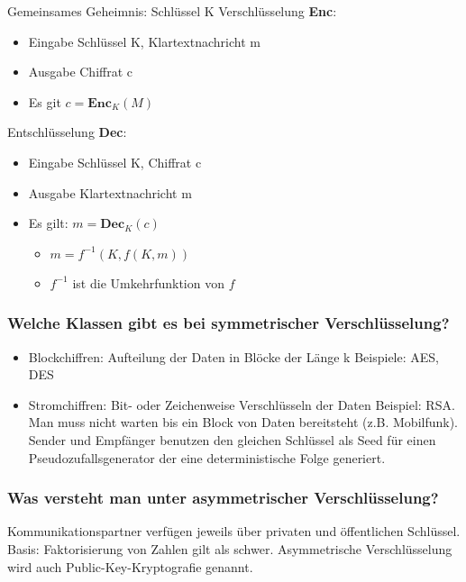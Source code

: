 	Gemeinsames Geheimnis: Schlüssel K
	Verschlüsselung \textbf{Enc}:
		\begin{itemize}
			\item Eingabe Schlüssel K, Klartextnachricht m
			\item Ausgabe Chiffrat c
			\item Es git $c=\textbf{Enc}_K(M)$
		\end{itemize}
	Entschlüsselung \textbf{Dec}:
		\begin{itemize}
			\item Eingabe Schlüssel K, Chiffrat c
			\item Ausgabe Klartextnachricht m
			\item Es gilt: $m = \textbf{Dec}_K(c)$
				\begin{itemize}
					\item $m = f^{-1}(K,f(K,m))$
					\item $f^{-1}$ ist die Umkehrfunktion von $f$
				\end{itemize}
		\end{itemize}
		
	\subsubsection{Welche Klassen gibt es bei symmetrischer Verschlüsselung?}
	\begin{itemize}
		\item Blockchiffren: Aufteilung der Daten in Blöcke der Länge k
		Beispiele: AES, DES
		
		\item Stromchiffren: Bit- oder Zeichenweise Verschlüsseln der Daten
		Beispiel: RSA. Man muss nicht warten bis ein Block von Daten bereitsteht (z.B. Mobilfunk). Sender und Empfänger benutzen den gleichen Schlüssel als Seed für einen Pseudozufallsgenerator der eine deterministische Folge generiert.
	\end{itemize}
	
	\subsubsection{Was versteht man unter asymmetrischer Verschlüsselung?}
	Kommunikationspartner verfügen jeweils über privaten und öffentlichen Schlüssel. Basis: Faktorisierung von Zahlen gilt als schwer. Asymmetrische Verschlüsselung wird auch Public-Key-Kryptografie genannt.
	

